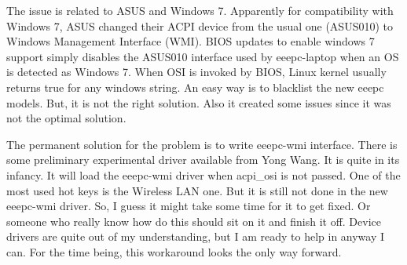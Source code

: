 The issue is related to ASUS and Windows 7. Apparently for compatibility with Windows 7, 
ASUS changed their ACPI device from the usual one (ASUS010) to Windows Management Interface (WMI). 
BIOS updates to enable windows 7 support simply disables the ASUS010 interface used by eeepc-laptop 
when an OS is detected as Windows 7. When OSI is invoked by BIOS, Linux kernel usually returns true 
for any windows string. An easy way is to blacklist the new eeepc models. But, it is not the right solution. 
Also it created some issues since it was not the optimal solution.

The permanent solution for the problem is to write eeepc-wmi interface. There is some preliminary 
experimental driver available from Yong Wang. It is quite in its infancy. It will load the eeepc-wmi 
driver when acpi\_osi is not passed. One of the most used hot keys is the Wireless LAN one. 
But it is still not done in the new eeepc-wmi driver. So, I guess it might take some time 
for it to get fixed. Or someone who really know how do this should sit on it and finish it off. 
Device drivers are quite out of my understanding, but I am ready to help in anyway I can. 
For the time being, this workaround looks the only way forward.

\newpage 
